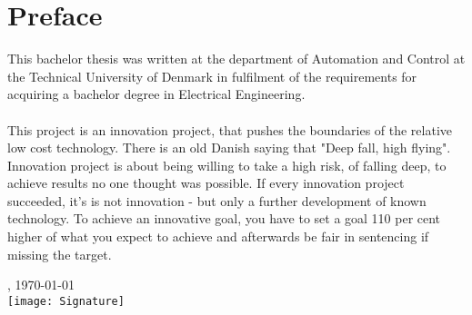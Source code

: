 \chapter{Preface}
This bachelor thesis was written at the department of Automation and Control at the Technical University of Denmark in fulfilment of the requirements for acquiring a bachelor degree in Electrical Engineering.\\
\\
\noindent
This project is an innovation project, that pushes the boundaries of the relative low cost technology. There is an old Danish saying that "Deep fall, high flying". Innovation project is about being willing to take a high risk, of falling deep, to achieve results no one thought was possible. If every innovation project succeeded, it's is not innovation - but only a further development of known technology. To achieve an innovative goal, you have to set a goal 110 per cent higher of what you expect to achieve and afterwards be fair in sentencing if missing the target.

\vfill

{
\centering
    \thesislocation{}, \today\\[1cm]
    \hspace{3cm}\texttt{[image: Signature]}\\[1cm]
\begin{flushright}
    \thesisauthor{}
\end{flushright}
}